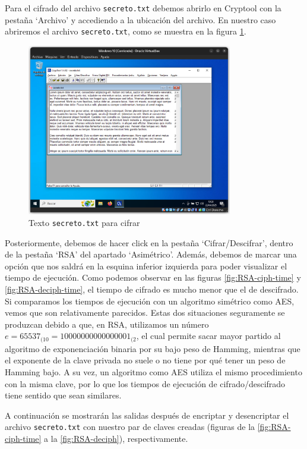 Para el cifrado del archivo \texttt{secreto.txt} debemos abrirlo en Cryptool con la pestaña `Archivo' y accediendo a la ubicación del archivo. En nuestro caso abriremos el archivo \texttt{secreto.txt}, como se muestra en la figura \ref{fig:RSA-secreto}.

\begin{figure}[H]
    \centering
    \includegraphics[width=0.8\textwidth]{EncriptadoRSA-1}
    \caption{Texto \texttt{secreto.txt} para cifrar}
    \label{fig:RSA-secreto}
\end{figure}

Posteriormente, debemos de hacer click en la pestaña `Cifrar/Descifrar', dentro de la pestaña `RSA' del apartado `Asimétrico'. Además, debemos de marcar una opción que nos saldrá en la esquina inferior izquierda para poder visualizar el tiempo de ejecución.
Como podemos observar en las figuras \ref{fig:RSA-ciph-time} y \ref{fig:RSA-deciph-time}, el tiempo de cifrado es mucho menor que el de descifrado. Si comparamos los tiempos de ejecución con un algoritmo simétrico como AES, vemos que son relativamente parecidos. Estas dos situaciones seguramente se produzcan debido a que, en RSA, utilizamos un número $e = 65537_{(10} = 10000000000000001_{(2}$, el cual permite sacar mayor partido al algoritmo de exponenciación binaria por su bajo peso de Hamming, mientras que el exponente de la clave privada no suele o no tiene por qué tener un peso de Hamming bajo.
A su vez, un algoritmo como AES utiliza el mismo procedimiento con la misma clave, por lo que los tiempos de ejecución de cifrado/descifrado tiene sentido que sean similares.

A continuación se mostrarán las salidas después de encriptar y desencriptar el archivo \texttt{secreto.txt} con nuestro par de claves creadas (figuras de la \ref{fig:RSA-ciph-time} a la \ref{fig:RSA-deciph}), respectivamente.

